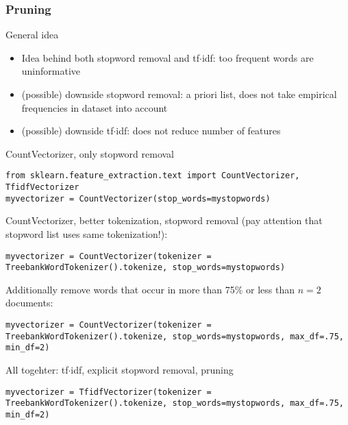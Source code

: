 \subsubsection{Pruning}

\begin{frame}{General idea}
\begin{itemize}
	\item Idea behind both stopword removal and tf$\cdot$idf: too frequent words are uninformative
	\item<2-> (possible) downside stopword removal: a priori list, does not take empirical frequencies in dataset into account
	\item<3-> (possible) downside tf$\cdot$idf: does not reduce number of features
\end{itemize}

\end{frame}

\begin{frame}
CountVectorizer, only stopword removal
\begin{lstlisting}
from sklearn.feature_extraction.text import CountVectorizer, TfidfVectorizer
myvectorizer = CountVectorizer(stop_words=mystopwords)
\end{lstlisting}

CountVectorizer, better tokenization, stopword removal (pay attention that stopword list uses same tokenization!):
\begin{lstlisting}
myvectorizer = CountVectorizer(tokenizer = TreebankWordTokenizer().tokenize, stop_words=mystopwords)
\end{lstlisting}

Additionally remove words that occur in more than 75\% or less than $n=2$ documents:
\begin{lstlisting}
myvectorizer = CountVectorizer(tokenizer = TreebankWordTokenizer().tokenize, stop_words=mystopwords, max_df=.75, min_df=2)
\end{lstlisting}

All togehter: tf$\cdot$idf, explicit stopword removal, pruning
\begin{lstlisting}
myvectorizer = TfidfVectorizer(tokenizer = TreebankWordTokenizer().tokenize, stop_words=mystopwords, max_df=.75, min_df=2)
\end{lstlisting}


\end{frame}


